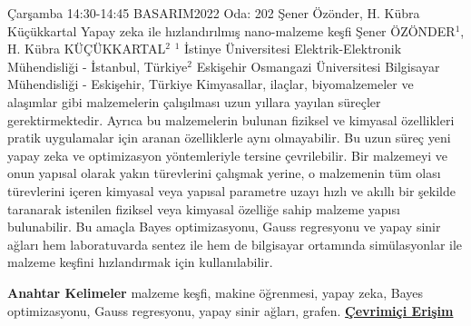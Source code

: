 
    \begin{abstract_basarim}
    {Çarşamba 14:30-14:45}
    {BASARIM2022}
    {Oda: 202}
    {Şener Özönder, H. Kübra Küçükkartal}
    {Yapay zeka ile hızlandırılmış nano-malzeme keşfi}
    {%
    Şener ÖZÖNDER$^{1}$, H. Kübra KÜÇÜKKARTAL$^{2}$}
    {%
    }
    {%
    $^1$ İstinye Üniversitesi Elektrik-Elektronik Mühendisliği - İstanbul, Türkiye\newline{}$^2$ Eskişehir Osmangazi Üniversitesi Bilgisayar Mühendisliği - Eskişehir, Türkiye}
    Kimyasallar, ilaçlar, biyomalzemeler ve alaşımlar gibi malzemelerin çalışılması uzun yıllara yayılan süreçler gerektirmektedir. Ayrıca bu malzemelerin bulunan fiziksel ve kimyasal özellikleri pratik uygulamalar için aranan özelliklerle aynı olmayabilir. Bu uzun süreç yeni yapay zeka ve optimizasyon yöntemleriyle tersine çevrilebilir. Bir malzemeyi ve onun yapısal olarak yakın türevlerini çalışmak yerine, o malzemenin tüm olası türevlerini içeren kimyasal veya yapısal parametre uzayı hızlı ve akıllı bir şekilde taranarak istenilen fiziksel veya kimyasal özelliğe sahip malzeme yapısı bulunabilir. Bu amaçla Bayes optimizasyonu, Gauss regresyonu ve yapay sinir ağları hem laboratuvarda sentez ile hem de bilgisayar ortamında simülasyonlar ile malzeme keşfini hızlandırmak için kullanılabilir. 
    
            \textbf{Anahtar Kelimeler} \newline{}malzeme keşfi, makine öğrenmesi, yapay zeka, Bayes optimizasyonu, Gauss regresyonu, yapay sinir ağları, grafen.
     \newline\newline\noindent \href{https://drive.google.com/file/d/1GF296mBNrqbRUvTzV5Qk8CS8uNqUE2bZ/view?usp=drivesdk}{\bfseries Çevrimiçi Erişim}
    \end{abstract_basarim}
    